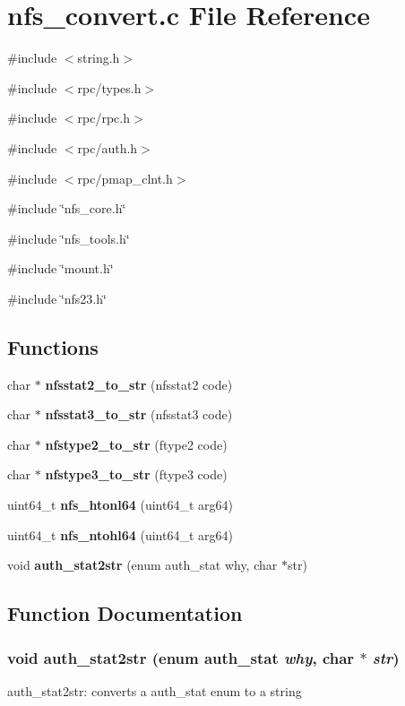 \section{nfs\_\-convert.c File Reference}
\label{nfs__convert_8c}
{\ttfamily \#include $<$string.h$>$}\par
{\ttfamily \#include $<$rpc/types.h$>$}\par
{\ttfamily \#include $<$rpc/rpc.h$>$}\par
{\ttfamily \#include $<$rpc/auth.h$>$}\par
{\ttfamily \#include $<$rpc/pmap\_\-clnt.h$>$}\par
{\ttfamily \#include \char`\"{}nfs\_\-core.h\char`\"{}}\par
{\ttfamily \#include \char`\"{}nfs\_\-tools.h\char`\"{}}\par
{\ttfamily \#include \char`\"{}mount.h\char`\"{}}\par
{\ttfamily \#include \char`\"{}nfs23.h\char`\"{}}\par
\subsection*{Functions}
\begin{DoxyCompactItemize}
\item 
char $\ast$ {\bf nfsstat2\_\-to\_\-str} (nfsstat2 code)
\item 
char $\ast$ {\bf nfsstat3\_\-to\_\-str} (nfsstat3 code)
\item 
char $\ast$ {\bf nfstype2\_\-to\_\-str} (ftype2 code)
\item 
char $\ast$ {\bf nfstype3\_\-to\_\-str} (ftype3 code)
\item 
uint64\_\-t {\bf nfs\_\-htonl64} (uint64\_\-t arg64)
\item 
uint64\_\-t {\bf nfs\_\-ntohl64} (uint64\_\-t arg64)
\item 
void {\bf auth\_\-stat2str} (enum auth\_\-stat why, char $\ast$str)
\end{DoxyCompactItemize}


\subsection{Function Documentation}
\subsubsection[{auth\_\-stat2str}]{\setlength{\rightskip}{0pt plus 5cm}void auth\_\-stat2str (enum auth\_\-stat {\em why}, \/  char $\ast$ {\em str})}\label{nfs__convert_8c_a5657f2f86e16f34b4a81906b5c828560}
auth\_\-stat2str: converts a auth\_\-stat enum to a string


